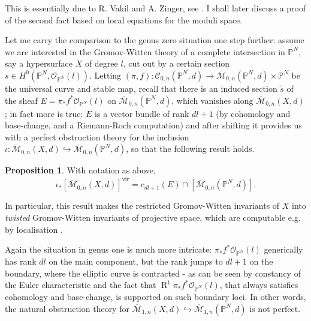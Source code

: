 \documentclass[11pt]{amsart}
\newcommand{\M}[4]{\overline{\mathcal{M}}_{#1,#2}(#3,#4)}
\newcommand{\PP}{\mathbb P}
\newcommand{\OO}{\mathcal{O}}
\renewcommand{\to}{\rightarrow}
\newcommand{\virt}[1]{[#1]^{\operatorname{vir}}}
\theoremstyle{definition}
\newtheorem{prop}[thm]{Proposition}
\theoremstyle{definition}
\begin{document}
This is essentially due to R. Vakil and A. Zinger, see \cite[Lemma~5.9]{Vre} \cite{VZpreview} \cite[???]{VISC}. I shall later discuss a proof of the second fact based on local equations for the moduli space.

Let me carry the comparison to the genus zero situation one step further: assume we are interested in the Gromov-Witten theory of a complete intersection in $\PP^N$, say a hypersurface $X$ of degree $l$, cut out by a certain section $s\in H^0(\PP^N,\OO_{\PP^N}(l))$. Letting $(\pi,f)\colon \mathcal C_{0,n}(\PP^N,d) \to \M{0}{n}{\PP^N}{d}\times \PP^N$ be the universal curve and stable map, recall that there is an induced section $\tilde{s}$ of the sheaf $E=\pi_*f^*\OO_{\PP^N}(l)$ on $\M{0}{n}{\PP^N}{d}$, which vanishes along $\M{0}{n}{X}{d}$; in fact more is true: $E$ is a vector bundle of rank $dl+1$ (by cohomology and base-change, and a Riemann-Roch computation) and after shifting it provides us with a perfect obstruction theory for the inclusion $\iota\colon \M{0}{n}{X}{d}\hookrightarrow\M{0}{n}{\PP^N}{d}$, so that the following result holds.

\begin{prop}\cite{CKL,KKP}
 With notation as above,
 \[\iota_*\virt{\M{0}{n}{X}{d}}=c_{dl+1}(E)\cap [\M{0}{n}{\PP^N}{d}].\]
\end{prop}
In particular, this result makes the restricted Gromov-Witten invariants of $X$ into \emph{twisted} Gromov-Witten invariants of projective space, which are computable e.g. by localisation \cite{Kon}.

Again the situation in genus one is much more intricate: $\pi_*f^*\OO_{\PP^N}(l)$ generically has rank $dl$ on the main component, but the rank jumps to $dl+1$ on the boundary, where the elliptic curve is contracted - as can be seen by constancy of the Euler characteristic and the fact that $\operatorname{R}^1\pi_*f^*\OO_{\PP^N}(l)$, that always satisfies cohomology and base-change, is supported on such boundary loci. In other words, the natural obstruction theory for $\M{1}{n}{X}{d}\hookrightarrow\M{1}{n}{\PP^N}{d}$ is not perfect.
\end{document}
